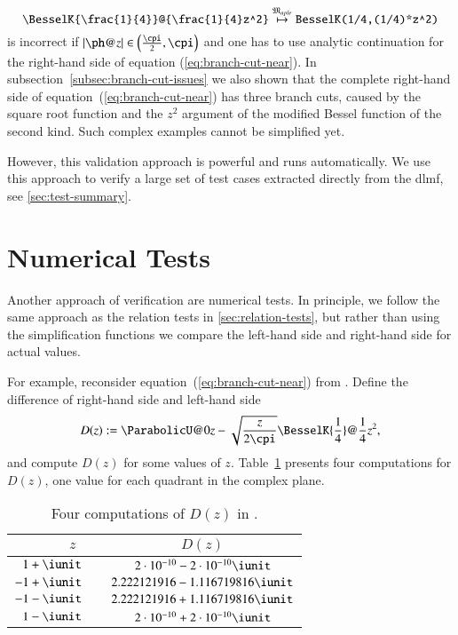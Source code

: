 \begin{equation}
\verb|\BesselK{\frac{1}{4}}@{\frac{1}{4}z^2}| \overset{\langMaple}{\mapsto} \verb|BesselK(1/4,(1/4)*z^2)|
\end{equation}
is incorrect if $|\ph@{z}| \in \left(\frac{\cpi}{2}, \cpi\right)$ and one has to use analytic continuation for the right-hand side of equation (\ref{eq:branch-cut-near}). In subsection~\ref{subsec:branch-cut-issues} we also shown that the complete right-hand side of equation~(\ref{eq:branch-cut-near}) has three branch cuts, caused by the square root function and the $z^2$ argument of the modified Bessel function of the second kind. Such complex examples cannot be simplified yet.

However, this validation approach is powerful and runs automatically. We use this approach to verify a large set of test cases extracted directly from the \gls{dlmf}, see \cref{sec:test-summary}.

\section{Numerical Tests}\label{sec:numerical-tests}
Another approach of verification are numerical tests. In principle, we follow the same approach as the relation tests in \cref{sec:relation-tests}, but rather than using the simplification functions we compare the left-hand side and right-hand side for actual values. 

For example, reconsider equation~(\ref{eq:branch-cut-near}) from \cite[(12.7.10)]{NIST:DLMF}. Define the difference of right-hand side and left-hand side
\begin{equation}\label{eq:difference}
D(z) := \ParabolicU@{0}{z} - \sqrt{\frac{z}{2\cpi}}\BesselK{\frac{1}{4}}@{\frac{1}{4}z^2},
\end{equation}
and compute $D(z)$ for some values of $z$. Table~\ref{tab:computations-for-difference} presents four computations for $D(z)$, one value for each quadrant in the complex plane.
\begin{table}[ht]
\centering
\begin{tabular}{rcc}
	\hline
	$z\ \ $ & & $D(z)$\\
	\hline
	\tableRowSpace{} $1+\iunit$ & & $2 \cdot 10^{-10} - 2 \cdot 10^{-10} \iunit$\\
	$-1+\iunit$& & $2.222121916 - 1.116719816 \iunit$\\
	$-1-\iunit$& & $2.222121916 + 1.116719816 \iunit$\\
	$1-\iunit$ & & $2 \cdot 10^{-10} + 2 \cdot 10^{-10} \iunit$\\
	\hline
\end{tabular}
\caption{Four computations of $D(z)$ in \Maple.}
\label{tab:computations-for-difference}
\end{table}

